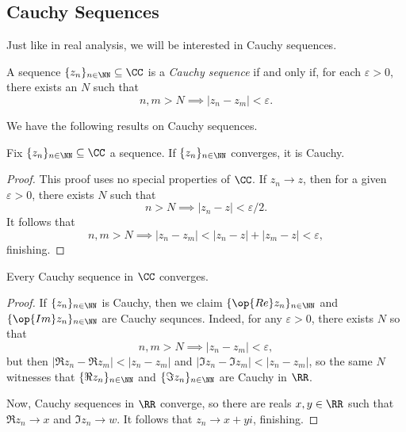 \subsection{Cauchy Sequences}
Just like in real analysis, we will be interested in Cauchy sequences.
\begin{definition}
	A sequence $\{z_n\}_{n\in\NN}\subseteq\CC$ is a \textit{Cauchy sequence} if and only if, for each $\varepsilon>0$, there exists an $N$ such that
	\[n,m>N\implies|z_n-z_m|<\varepsilon.\]
\end{definition}
We have the following results on Cauchy sequences.
\begin{proposition}
	Fix $\{z_n\}_{n\in\NN}\subseteq\CC$ a sequence. If $\{z_n\}_{n\in\NN}$ converges, it is Cauchy.
\end{proposition}
\begin{proof}
	This proof uses no special properties of $\CC$. If $z_n\to z$, then for a given $\varepsilon>0$, there exists $N$ such that
	\[n>N\implies|z_n-z|<\varepsilon/2.\]
	It follows that
	\[n,m>N\implies|z_n-z_m|<|z_n-z|+|z_m-z|<\varepsilon,\]
	finishing.
\end{proof}
\begin{proposition}
	Every Cauchy sequence in $\CC$ converges.
\end{proposition}
\begin{proof}
	If $\{z_n\}_{n\in\NN}$ is Cauchy, then we claim $\{\op{Re}z_n\}_{n\in\NN}$ and $\{\op{Im}z_n\}_{n\in\NN}$ are Cauchy sequnces. Indeed, for any $\varepsilon>0$, there exists $N$ so that
	\[n,m>N\implies|z_n-z_m|<\varepsilon,\]
	but then $|\Re z_n-\Re z_m|<|z_n-z_m|$ and $|\Im z_n-\Im z_m|<|z_n-z_m|$, so the same $N$ witnesses that $\{\Re z_n\}_{n\in\NN}$ and $\{\Im z_n\}_{n\in\NN}$ are Cauchy in $\RR$.

	Now, Cauchy sequences in $\RR$ converge, so there are reals $x,y\in\RR$ such that $\Re z_n\to x$ and $\Im z_n\to w$. It follows that $z_n\to x+yi$, finishing.
\end{proof}

